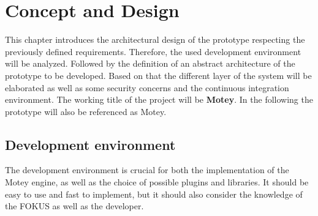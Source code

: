 \chapter{Concept and Design}
\label{chapter:concept}
\minitoc\vspace{.5cm}
This chapter introduces the architectural design of the prototype respecting the previously defined requirements.
Therefore, the used development environment will be analyzed.
Followed by the definition of an abstract architecture of the prototype to be developed.
Based on that the different layer of the system will be elaborated as well as some security concerns and the continuous integration environment.
The working title of the project will be \textbf{Motey}.
In the following the prototype will also be referenced as Motey.


\section{Development environment}
The development environment is crucial for both the implementation of the Motey engine, as well as the choice of possible plugins and libraries.
It should be easy to use and fast to implement, but it should also consider the knowledge of the \ac{FOKUS} as well as the developer.

%

